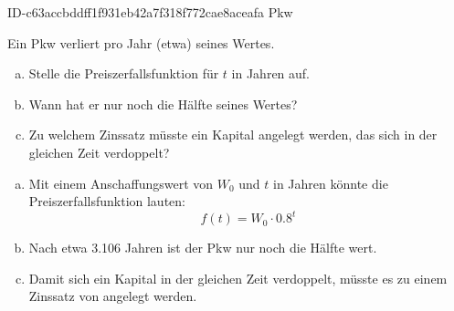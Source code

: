 \begin{exercise}
      {ID-c63accbddff1f931eb42a7f318f772cae8aceafa}
      {Pkw}
  \ifproblem\problem\par
    Ein Pkw verliert pro Jahr (etwa)  seines Wertes.
    \begin{enumerate}[a)]
      \item Stelle die Preiszerfallsfunktion für $t$ in Jahren auf.
      \item Wann hat er nur noch die Hälfte seines Wertes?
      \item Zu welchem Zinssatz müsste ein Kapital angelegt werden,
            das sich in der gleichen Zeit verdoppelt?
    \end{enumerate}
  \fi
  \ifoutcome\outcome\par
    \begin{enumerate}[a)]
      \item Mit einem Anschaffungswert von $W_{0}$ und $t$ in Jahren
            könnte die Preiszerfallsfunktion lauten:
            \begin{equation*}
              f(t)=W_{0}\cdot\num{0.8}^{t}
            \end{equation*}
      \item Nach etwa \num{3.106} Jahren ist der Pkw nur
            noch die Hälfte wert.
      \item Damit sich ein Kapital in der gleichen Zeit verdoppelt,
            müsste es zu einem Zinssatz von  angelegt werden.
    \end{enumerate}
  \fi
\end{exercise}

